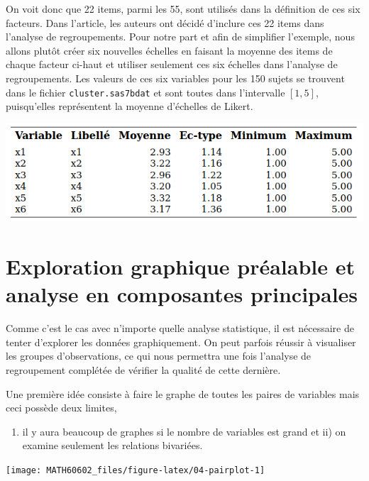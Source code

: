 \documentclass[
  11pt,
  letterpaper,
]{book}
\providecommand{\tightlist}{%
  \setlength{\itemsep}{0pt}\setlength{\parskip}{0pt}}
\theoremstyle{definition}
\theoremstyle{definition}
\theoremstyle{definition}
\theoremstyle{definition}
\theoremstyle{remark}
\begin{document}
On voit donc que 22 items, parmi les 55, sont utilisés dans la définition de ces six facteurs. Dans l'article, les auteurs ont décidé d'inclure ces 22 items dans l'analyse de regroupements. Pour notre part et afin de simplifier l'exemple, nous allons plutôt créer six nouvelles échelles en faisant la moyenne des items de chaque facteur ci-haut et utiliser seulement ces six échelles dans l'analyse de regroupements. Les valeurs de ces six variables pour les 150 sujets se trouvent dans le fichier \texttt{cluster.sas7bdat} et sont toutes dans l'intervalle \([1,5]\), puisqu'elles représentent la moyenne d'échelles de Likert.

\begin{center}\includegraphics[width=0.8\linewidth]{figures/04-clustering-e1} \end{center}

\hypertarget{exploration-graphique-pruxe9alable-et-analyse-en-composantes-principales}{%
\section{Exploration graphique préalable et analyse en composantes principales}\label{exploration-graphique-pruxe9alable-et-analyse-en-composantes-principales}}

Comme c'est le cas avec n'importe quelle analyse statistique, il est nécessaire de tenter d'explorer les données graphiquement. On peut parfois réussir à visualiser les groupes d'observations, ce qui nous permettra une fois l'analyse de regroupement complétée de vérifier la qualité de cette dernière.

Une première idée consiste à faire le graphe de toutes les paires de variables mais ceci possède deux limites,

\begin{enumerate}
\def\labelenumi{\roman{enumi})}
\tightlist
\item
  il y aura beaucoup de graphes si le nombre de variables est grand et ii) on examine seulement les relations bivariées.
\end{enumerate}

\begin{center}\texttt{[image: MATH60602\_files/figure-latex/04-pairplot-1]} \end{center}
\end{document}
